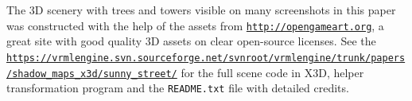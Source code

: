 \documentclass{acmsiggraph}                     %
\newcommand*{\myhref}[2]{\texttt{\href{#1}{\nolinkurl{#2}}}}
\begin{document}
The 3D scenery with trees and towers visible on many screenshots in this paper
was constructed with the help of the assets from \myhref{http://opengameart.org}{http://opengameart.org},
a great site with good quality 3D assets on clear open-source licenses.
See the \myhref{https://vrmlengine.svn.sourceforge.net/svnroot/vrmlengine/trunk/papers/shadow\_maps\_x3d/sunny\_street/}{https://vrmlengine.svn.sourceforge.net/svnroot/vrmlengine/trunk/papers/shadow_maps_x3d/sunny_street/}
for the full scene code in X3D, helper transformation program and the
\texttt{README.txt} file with detailed credits.



\nocite{*}

\end{document}
